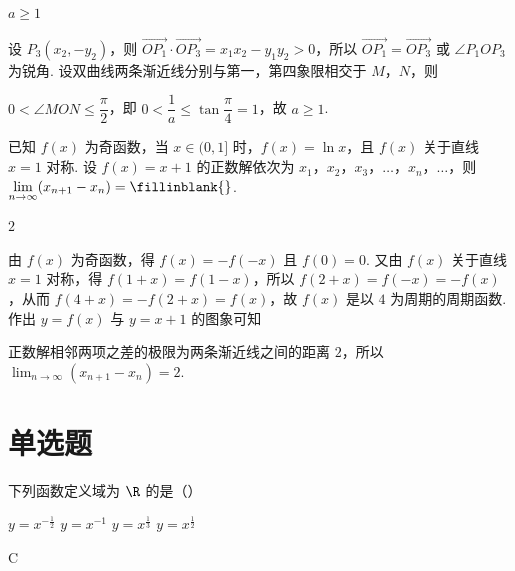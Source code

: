 \begin{answer}
\(a\ge1\)
\end{answer}

\begin{solution}
设 \(P_3(x_2,-y_2)\)，则 \(\overrightarrow{OP_1}\cdot\overrightarrow{OP_3}=x_1x_2-y_1y_2>0\)，所以 \(\overrightarrow{OP_1}=\overrightarrow{OP_3}\) 或 \(\angle P_1OP_3\) 为锐角. 设双曲线两条渐近线分别与第一，第四象限相交于 \(M\)，\(N\)，则

\(0<\angle MON\le\dfrac\pi2\)，即 \(0<\dfrac1a\le\tan\dfrac\pi4=1\)，故 \(a\ge1\).
\end{solution}

\begin{problem}
已知 \(f(x)\) 为奇函数，当 \(x\in(0,1]\) 时，\(f(x)=\ln x\)，且 \(f(x)\) 关于直线 \(x=1\) 对称. 设 \(f(x)=x+1\) 的正数解依次为 \(x_1\)，\(x_2\)，\(x_3\)，\(\ldots\)，\(x_n\)，\(\ldots\)，则 \(\displaystyle\lim_{n\to\infty}(x_{n+1}-x_n)=\fillinblank{}\).
\end{problem}

\begin{answer}
\(2\)
\end{answer}

\begin{solution}
由 \(f(x)\) 为奇函数，得 \(f(x)=-f(-x)\) 且 \(f(0)=0\). 又由 \(f(x)\) 关于直线 \(x=1\) 对称，得 \(f(1+x)=f(1-x)\)，所以 \(f(2+x)=f(-x)=-f(x)\)，从而 \(f(4+x)=-f(2+x)=f(x)\)，故 \(f(x)\) 是以 \(4\) 为周期的周期函数. 作出 \(y=f(x)\) 与 \(y=x+1\) 的图象可知

正数解相邻两项之差的极限为两条渐近线之间的距离 \(2\)，所以 \(\displaystyle\lim_{n\to\infty}(x_{n+1}-x_n)=2\).
\end{solution}

\section{单选题}

\begin{problem}
下列函数定义域为 \(\R\) 的是（\quad）

\choices
    {\(y=x^{-\frac12}\)}
    {\(y=x^{-1}\)}
    {\(y=x^{\frac13}\)}
    {\(y=x^{\frac12}\)}
\end{problem}

\begin{answer}
C
\end{answer}

